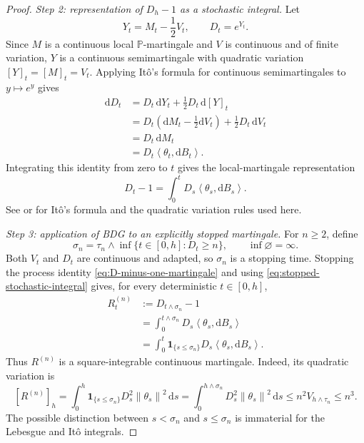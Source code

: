 \documentclass[11pt]{article}
\newcommand{\ip}[2]{\left\langle #1,#2\right\rangle}
\newcommand{\norm}[1]{\left\lVert #1\right\rVert}
\newcommand{\1}{\mathbf 1}
\newcommand{\df}{\mathrm{d}}
\begin{document}
\begin{proof}
		\smallskip
		\noindent\emph{Step 2: representation of \(D_h-1\) as a stochastic integral.}
		Let
		\[
		Y_t=M_t-\frac12V_t,
		\qquad
		D_t=e^{Y_t}.
		\]
		Since \(M\) is a continuous local \(\mathbb P\)-martingale and
		\(V\) is continuous and of finite variation, \(Y\) is a continuous
		semimartingale with quadratic variation
		\([Y]_t=[M]_t=V_t\).
		Applying It\^o's formula for continuous semimartingales
		\citep[Section~3.3.A, Theorem~3.3]{KaratzasShreve1991}
		to \(y\mapsto e^y\) gives
		\begin{align*}
			\df D_t
			&=
			D_t\,\df Y_t+\frac12D_t\,\df[Y]_t\\
			&=
			D_t\left(\df M_t-\frac12\df V_t\right)
			+\frac12D_t\,\df V_t\\
			&=
			D_t\,\df M_t\\
			&=
			D_t\ip{\theta_t}{\df B_t}.
		\end{align*}
		Integrating this identity from zero to \(t\) gives the local-martingale
		representation
		\begin{equation}\label{eq:D-minus-one-martingale}
			D_t-1
			=
			\int_0^tD_s\ip{\theta_s}{\df B_s}.
		\end{equation}
		See \citet[Chapter~3]{KaratzasShreve1991} or
		\citet[Chapter~IV]{RevuzYor1999} for It\^o's formula and the quadratic
		variation rules used here.
		
		\smallskip
		\noindent\emph{Step 3: application of BDG to an explicitly stopped martingale.}
		For \(n\geq2\), define
		\[
		\sigma_n
		=
		\tau_n\wedge
		\inf\{t\in[0,h]:D_t\geq n\},
		\qquad
		\inf\varnothing=\infty.
		\]
		Both \(V_t\) and \(D_t\) are continuous and adapted, so \(\sigma_n\) is a
		stopping time. Stopping the process identity
		\eqref{eq:D-minus-one-martingale} and using
		\eqref{eq:stopped-stochastic-integral} gives, for every deterministic
		\(t\in[0,h]\),
		\begin{align*}
			R_t^{(n)}
			&:=
			D_{t\wedge\sigma_n}-1\\
			&=
			\int_0^{t\wedge\sigma_n}
			D_s\ip{\theta_s}{\df B_s}\\
			&=
			\int_0^t
			\1_{\{s\leq\sigma_n\}}D_s\ip{\theta_s}{\df B_s}.
		\end{align*}
		Thus \(R^{(n)}\) is a square-integrable continuous martingale. Indeed,
		its quadratic variation is
		\[
		[R^{(n)}]_h
		=
		\int_0^h
		\1_{\{s\leq\sigma_n\}}
		D_s^2\norm{\theta_s}^2\,\df s
		=
		\int_0^{h\wedge\sigma_n}
		D_s^2\norm{\theta_s}^2\,\df s
		\leq
		n^2V_{h\wedge\tau_n}
		\leq n^3.
		\]
		The possible distinction between \(s<\sigma_n\) and
		\(s\leq\sigma_n\) is immaterial for the Lebesgue and It\^o integrals.
		

\end{proof}
\end{document}
